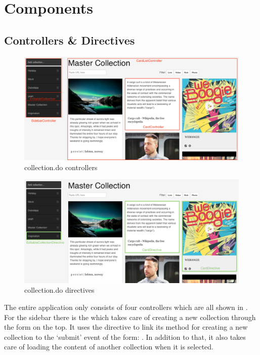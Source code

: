 \section{Components}

\subsection{Controllers \& Directives}

\begin{figure}[htb]
  \centerline{
    \includegraphics[width=\linewidth]{images/collection-controllers.png}
  }
  \caption[collection.do controllers]{collection.do controllers}
  \label{fig:collection-controllers}
\end{figure}

\begin{figure}[htb]
  \centerline{
    \includegraphics[width=\linewidth]{images/collection-directives.png}
  }
  \caption[collection.do directives]{collection.do directives}
  \label{fig:collection-directives}
\end{figure}

The entire application only consists of four controllers which are all shown in . For the sidebar there is the  which takes care of creating a new collection through the form on the top. It uses the  directive to link its method for creating a new collection to the `submit' event of the form: . In addition to that, it also takes care of loading the content of another collection when it is selected.

